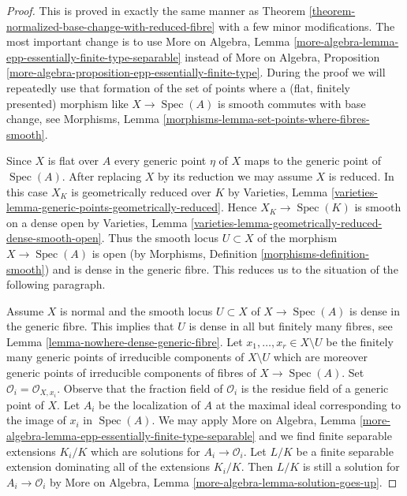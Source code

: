 \documentclass[10pt,a4paper]{amsart}
\theoremstyle{plain}
\theoremstyle{definition}
\theoremstyle{remark}
\numberwithin{equation}{subsection}
\def\Spec{\mathop{\mathrm{Spec}}}
\begin{document}
\begin{proof}
This is proved in exactly the same manner as
Theorem \ref{theorem-normalized-base-change-with-reduced-fibre}
with a few minor modifications. The most important change
is to use More on Algebra, Lemma
\ref{more-algebra-lemma-epp-essentially-finite-type-separable}
instead of More on Algebra, Proposition
\ref{more-algebra-proposition-epp-essentially-finite-type}.
During the proof we will repeatedly use that formation of the set of points
where a (flat, finitely presented) morphism like $X \to \Spec(A)$ is
smooth commutes with base change, see
Morphisms, Lemma \ref{morphisms-lemma-set-points-where-fibres-smooth}.

\medskip\noindent
Since $X$ is flat over $A$ every generic point $\eta$ of $X$ maps to the
generic point of $\Spec(A)$.
After replacing $X$ by its reduction we may assume $X$ is reduced.
In this case $X_K$ is geometrically reduced over $K$
by Varieties, Lemma \ref{varieties-lemma-generic-points-geometrically-reduced}.
Hence $X_K \to \Spec(K)$ is smooth on a dense open by
Varieties, Lemma \ref{varieties-lemma-geometrically-reduced-dense-smooth-open}.
Thus the smooth locus $U \subset X$ of the morphism $X \to \Spec(A)$
is open (by Morphisms, Definition \ref{morphisms-definition-smooth})
and is dense in the generic fibre. This reduces us to the situation
of the following paragraph.

\medskip\noindent
Assume $X$ is normal and the smooth locus $U \subset X$ of $X \to \Spec(A)$
is dense in the generic fibre. This implies that $U$ is dense in all but
finitely many fibres, see Lemma \ref{lemma-nowhere-dense-generic-fibre}.
Let $x_1, \ldots, x_r \in X \setminus U$ be the finitely many generic
points of irreducible components of $X \setminus U$ which are moreover
generic points of irreducible components of fibres of $X \to \Spec(A)$.
Set $\mathcal{O}_i = \mathcal{O}_{X, x_i}$. Observe that the fraction
field of $\mathcal{O}_i$ is the residue field of a generic point of $X$.
Let $A_i$ be the localization of $A$ at the maximal ideal corresponding
to the image of $x_i$ in $\Spec(A)$. We may apply More on Algebra, Lemma
\ref{more-algebra-lemma-epp-essentially-finite-type-separable}
and we find finite separable extensions $K_i/K$ which are
solutions for $A_i \to \mathcal{O}_i$. Let $L/K$ be a finite
separable extension dominating all of the extensions $K_i/K$.
Then $L/K$ is still a solution for $A_i \to \mathcal{O}_i$ by
More on Algebra, Lemma \ref{more-algebra-lemma-solution-goes-up}.


\end{proof}
\end{document}
